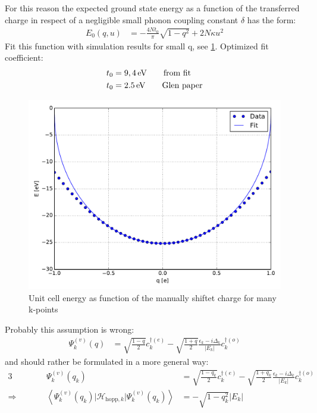 For this reason the expected ground state energy  as a function of the transferred charge in respect of a negligible small  phonon coupling constant $\delta$ has the form:
\begin{align}
E_0(q, u) &= -\frac{4Nt_0}{\pi} \sqrt{1-q^2} + 2N\kappa u^2
\end{align}  
Fit this function with simulation results for small q, see \cref{image_cdft_many_kpts}. Optimized fit coefficient:
\begin{align}
t_0 &= \unit[9,4]{eV}\qquad\text{from fit}\\
t_0 &= \unit[2.5]{eV}\qquad\text{Glen paper}
\end{align}
\begin{figure}
	\centering
	\includegraphics[width = \textwidth]{Images/CDFT/cdft_energy_many_kpts.pdf}
	\caption[Unit cell energy as function of the manually shiftet charge for many k-points]{Unit cell energy as function of the manually shiftet charge for many k-points}
	\label{image_cdft_many_kpts}
\end{figure}
Probably this assumption is wrong:
\begin{align}
\Psi_k^{(v)}(q) &= \sqrt{\frac{1-q}{2}}c_k^{\dagger(e)}- \sqrt{\frac{1+q}{2}}\frac{\epsilon_k - i \Delta_k}{|E_k|}c_{k}^{\dagger(o)}
\end{align}
and should rather be formulated in a more general way:
\begin{alignat}{3}
&&\Psi_k^{(v)}(q_k) &= \sqrt{\frac{1-q_k}{2}}c_k^{\dagger(e)}- \sqrt{\frac{1+q_k}{2}}\frac{\epsilon_k - i \Delta_k}{|E_k|}c_{k}^{\dagger(o)}\\
\Rightarrow&\qquad&\left\langle\Psi_k^{(v)}(q_k)\Big|\mathcal{H}_{\text{hopp},k}\Big|\Psi_k^{(v)}(q_k)\right\rangle &= -\sqrt{1-q^2_k} |E_k|
\end{alignat}
